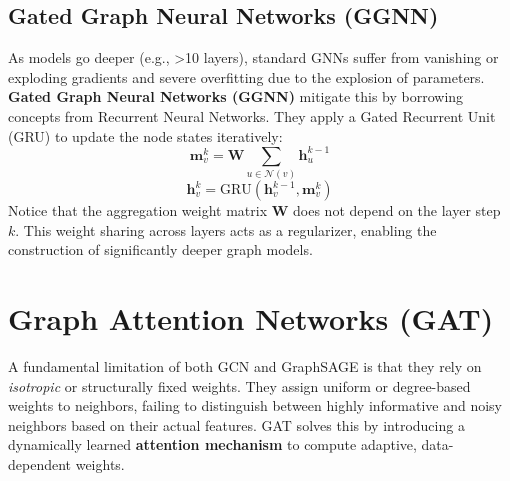 \subsection{Gated Graph Neural Networks (GGNN)}
As models go deeper (e.g., >10 layers), standard GNNs suffer from vanishing or exploding gradients and severe overfitting due to the explosion of parameters. \textbf{Gated Graph Neural Networks (GGNN)} mitigate this by borrowing concepts from Recurrent Neural Networks. They apply a Gated Recurrent Unit (GRU) to update the node states iteratively:
\begin{equation}
    \mathbf{m}_v^k = \mathbf{W} \sum_{u \in \mathcal{N}(v)} \mathbf{h}_u^{k-1}
\end{equation}
\begin{equation}
    \mathbf{h}_v^k = \text{GRU}(\mathbf{h}_v^{k-1}, \mathbf{m}_v^k)
\end{equation}
Notice that the aggregation weight matrix $\mathbf{W}$ does not depend on the layer step $k$. This weight sharing across layers acts as a regularizer, enabling the construction of significantly deeper graph models.

\section{Graph Attention Networks (GAT)}
A fundamental limitation of both GCN and GraphSAGE is that they rely on \textit{isotropic} or structurally fixed weights. They assign uniform or degree-based weights to neighbors, failing to distinguish between highly informative and noisy neighbors based on their actual features. 
GAT solves this by introducing a dynamically learned \textbf{attention mechanism} to compute adaptive, data-dependent weights.

